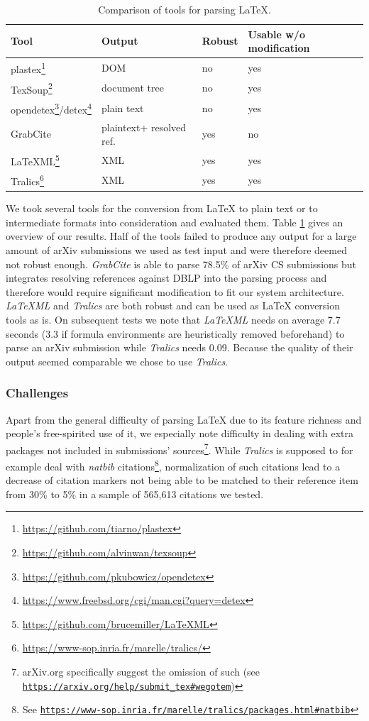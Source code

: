 \begin{table}[t]
\centering
  \caption{Comparison of tools for parsing \LaTeX{}.}
  \label{tbl:tools}
\begin{tabular}{llll}
\toprule
    Tool & Output & Robust & Usable w/o modification \\
   \midrule
    plastex\footnote{\url{https://github.com/tiarno/plastex}} & DOM & no & yes\\
    TexSoup\footnote{\url{https://github.com/alvinwan/texsoup}} & document tree & no & yes\\
    opendetex\footnote{\url{https://github.com/pkubowicz/opendetex}}/detex\footnote{\url{https://www.freebsd.org/cgi/man.cgi?query=detex}} & plain text & no & yes\\
    GrabCite\cite{Faerber2018} & plain\hphantom{ }text\hphantom{ }+ resolved ref. & yes & no\\
    LaTeXML\footnote{\url{https://github.com/brucemiller/LaTeXML}} & XML & yes & yes\\
    Tralics\footnote{\url{https://www-sop.inria.fr/marelle/tralics/}} & XML & yes & yes\\
  \bottomrule
\end{tabular}
\end{table}

We took several tools for the conversion from \LaTeX{} to plain text or to intermediate formats into consideration and evaluated them. Table \ref{tbl:tools} gives an overview of our results. Half of the tools failed to produce any output for a large amount of arXiv submissions we used as test input and were therefore deemed not robust enough. \textit{GrabCite} is able to parse 78.5\% of arXiv CS submissions but integrates resolving references against DBLP into the parsing process and therefore would require significant modification to fit our system architecture. \textit{LaTeXML} and \textit{Tralics} are both robust and can be used as \LaTeX{} conversion tools as is. On subsequent tests we note that \textit{LaTeXML} needs on average 7.7 seconds (3.3 if formula environments are heuristically removed beforehand) to parse an arXiv submission while \textit{Tralics} needs 0.09. Because the quality of their output seemed comparable we chose to use \textit{Tralics}.

\subsubsection{Challenges}
Apart from the general difficulty of parsing \LaTeX{} due to its feature richness and people's free-spirited use of it, we especially note difficulty in dealing with extra packages not included in submissions' sources\footnote{arXiv.org specifically suggest the omission of such (see \texttt{\url{https://arxiv.org/help/submit\_tex\#wegotem}})}. While \textit{Tralics} is supposed to for example deal with \textit{natbib} citations\footnote{See \texttt{\url{https://www-sop.inria.fr/marelle/tralics/packages.html\#natbib}}}, normalization of such citations lead to a decrease of citation markers not being able to be matched to their reference item from 30\% to 5\% in a sample of 565,613 citations we tested.


